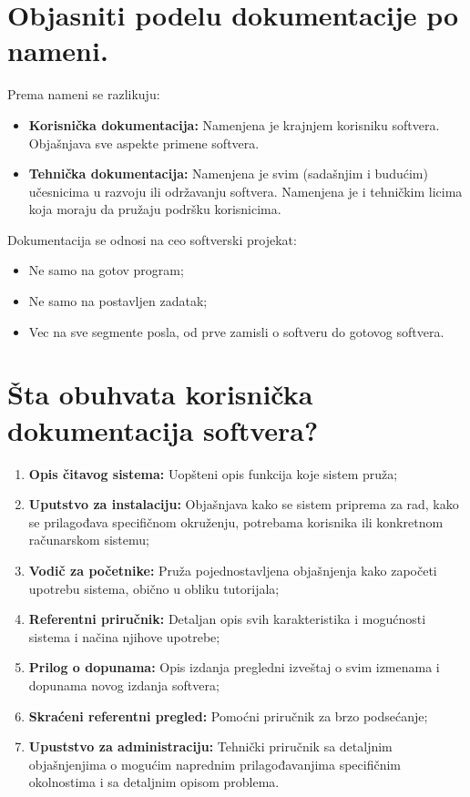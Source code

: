 \documentclass[a4paper]{article}
\begin{document}
\section{Objasniti podelu dokumentacije po nameni.}
  \noindent Prema nameni se razlikuju:
  \begin{itemize}
      \item \textbf{Korisnička dokumentacija:} Namenjena je krajnjem korisniku softvera. 
            Objašnjava sve aspekte primene softvera.
      \item \textbf{Tehnička dokumentacija:} Namenjena je svim (sadašnjim i budućim) učesnicima u 
            razvoju ili održavanju softvera. Namenjena je i tehničkim licima koja moraju da pružaju 
            podršku korisnicima.
  \end{itemize}
  Dokumentacija se odnosi na ceo softverski projekat:
  \begin{itemize}
      \item Ne samo na gotov program;
      \item Ne samo na postavljen zadatak;
      \item Vec na sve segmente posla, od prve zamisli o softveru do gotovog softvera.
  \end{itemize}

\section{Šta obuhvata korisnička dokumentacija softvera?}
  \begin{enumerate}
    \item \textbf{Opis čitavog sistema:} Uopšteni opis funkcija koje sistem pruža;
    \item \textbf{Uputstvo za instalaciju:} Objašnjava kako se sistem priprema za rad, 
          kako se prilagođava specifičnom okruženju, potrebama korisnika ili konkretnom 
          računarskom sistemu;
    \item \textbf{Vodič za početnike:} Pruža pojednostavljena objašnjenja kako započeti upotrebu 
          sistema, obično u obliku tutorijala;
    \item \textbf{Referentni priručnik:} Detaljan opis svih karakteristika i mogućnosti sistema 
          i načina njihove upotrebe;
    \item \textbf{Prilog o dopunama:} Opis izdanja pregledni izveštaj o svim izmenama i dopunama 
          novog izdanja softvera;
    \item \textbf{Skraćeni referentni pregled:} Pomoćni priručnik za brzo podsećanje;
    \item \textbf{Upuststvo za administraciju:} Tehnički priručnik sa detaljnim objašnjenjima o 
          mogućim naprednim prilagođavanjima specifičnim okolnostima i sa detaljnim opisom problema.
  \end{enumerate}
  
\end{document}
